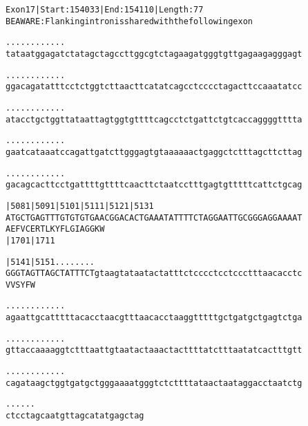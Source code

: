 \documentclass{article}
\begin{document}
\newpage
\begin{alltt}
Exon 17 | Start: 154033 | End: 154110 | Length: 77
BE AWARE: Flanking intron is shared with the following exon

.    .    .    .    .    .    .    .    .    .    .    .    
tataatggagatctatagctagccttggcgtctagaagatgggtgttgagaagagggagt

.    .    .    .    .    .    .    .    .    .    .    .    
ggacagatatttcctctggtcttaacttcatatcagcctcccctagacttccaaatatcc

.    .    .    .    .    .    .    .    .    .    .    .    
atacctgctggttataattagtggtgttttcagcctctgattctgtcaccaggggtttta

.    .    .    .    .    .    .    .    .    .    .    .    
gaatcataaatccagattgatcttgggagtgtaaaaaactgaggctctttagcttcttag

.    .    .    .    .    .    .    .    .    .    .    .    
gacagcacttcctgattttgttttcaacttctaatcctttgagtgtttttcattctgcag

      |5081     |5091     |5101     |5111     |5121     |5131
ATGCTGAGTTTGTGTGTGAACGGACACTGAAATATTTTCTAGGAATTGCGGGAGGAAAAT
  A  E  F  V  C  E  R  T  L  K  Y  F  L  G  I  A  G  G  K  W
                          |1701                         |1711

      |5141     |5151 .    .    .    .    .    .    .    .  
GGGTAGTTAGCTATTTCTgtaagtataatactatttctcccctcctccctttaacacctc
  V  V  S  Y  F  W                                          

  .    .    .    .    .    .    .    .    .    .    .    .  
agaattgcatttttacacctaacgtttaacacctaaggtttttgctgatgctgagtctga

  .    .    .    .    .    .    .    .    .    .    .    .  
gttaccaaaaggtctttaattgtaatactaaactacttttatctttaatatcactttgtt

  .    .    .    .    .    .    .    .    .    .    .    .  
cagataagctggtgatgctgggaaaatgggtctcttttataactaataggacctaatctg

  .    .    .    .    .    .
ctcctagcaatgttagcatatgagctag
\end{alltt}
\newpage
\end{document}
